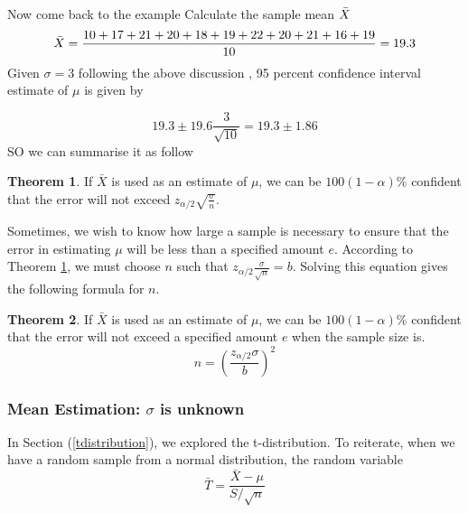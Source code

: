 \documentclass[12pt,a4paper]{article}
\theoremstyle{example}
\theoremstyle{definition}
\theoremstyle{theorem}
\newtheorem{theorem}{Theorem}
\begin{document}
Now come back to the example 
 Calculate the sample mean $\Bar{X}$
 $$\Bar{X}=\frac{10+17+21+20+18+19+22+20+21+16+19}{10}=19.3$$
 Given $\sigma=3$ following the above discussion , 95 percent confidence interval estimate of $\mu$ is
given by

$$19.3\pm 19.6 \frac{3}{\sqrt{10}}=19.3\pm1.86 $$
SO we can summarise it as follow 

\begin{theorem}
    If $\bar{X}$ is used as an estimate of $\mu$, we can be $100(1 - \alpha)\%$ confident that the error will not exceed $z_{\alpha/2} \sqrt{\frac{\sigma}{n}}$.
\label{thermerro}
\end{theorem}

Sometimes, we wish to know how large a sample is necessary to ensure that the error in estimating $\mu$ will be less than a specified amount $e$. According to Theorem \ref{thermerro}, we must choose $n$ such that $z_{\alpha/2} \frac{\sigma}{\sqrt{ n}} = b$. Solving this equation gives the following formula for $n$.
\begin{theorem}
    If $\bar{X}$ is used as an estimate of $\mu$, we can be $100(1 - \alpha)\%$ confident that the error will not exceed a specified amount $e$ when the sample size is.
    $$n=\left(\frac{z_{\alpha/2}\sigma}{b}\right)^2$$
\end{theorem}
\subsubsection{Mean Estimation: $\sigma$ is unknown}\label{secUnkonwSigma}
In Section (\ref{tdistribution}), we explored the t-distribution. To reiterate, when we have a random sample from a normal distribution, the random variable
\begin{equation}\label{Tform}
    \bar{T} = \frac{\bar{X} - \mu}{S/\sqrt{n}} 
\end{equation}
\end{document}
